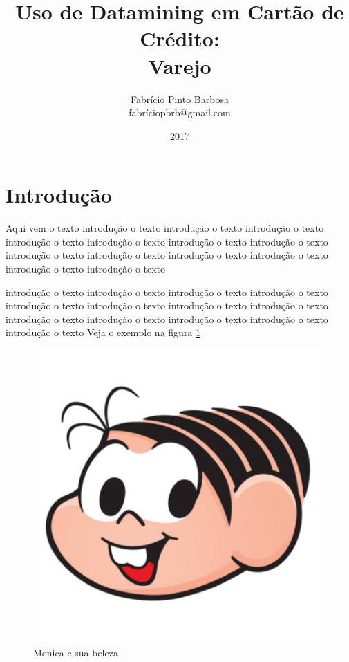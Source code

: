 \documentclass[a4paper, 12pt]{article}
\title{Uso de Datamining em Cartão de Crédito:\\Varejo}
\author{Fabrício Pinto Barbosa \\ fabríciopbrb@gmail.com}
\date{2017}
\begin{document}
\maketitle \newpage

\tableofcontents \newpage
\listoffigures \newpage

\section{Introdução}
	Aqui vem o texto introdução o texto introdução o texto introdução o texto introdução o texto introdução o texto introdução o texto introdução o texto introdução o texto introdução o texto introdução o texto introdução o texto introdução o texto introdução o texto
	
	 introdução o texto introdução o texto introdução o texto introdução o texto introdução o texto introdução o texto introdução o texto introdução o texto introdução o texto introdução o texto introdução o texto introdução o texto introdução o texto 
	 Veja o exemplo na figura \ref{monica}
	 
\begin{figure}[!htb]
	\centering
	\includegraphics[scale=0.2]{img/monica.jpg}
	\caption{Monica e sua beleza}
	\label{monica}
\end{figure}		 
	 
\end{document}
